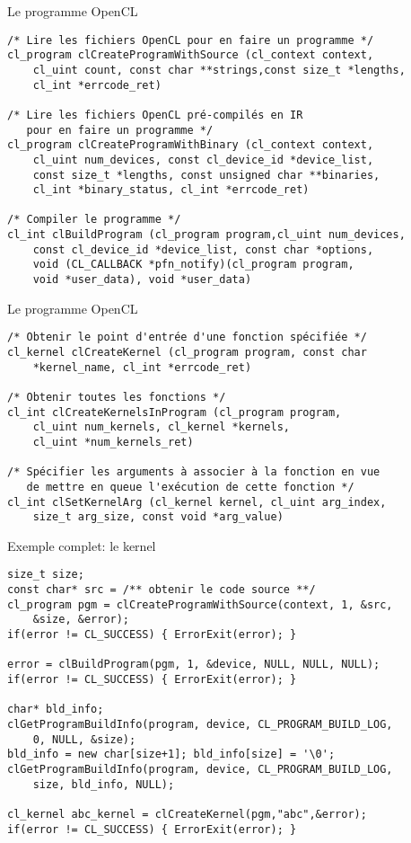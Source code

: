 \documentclass[10pt]{beamer}
\begin{document}
\begin{frame}[fragile]{Le programme OpenCL}

  \scriptsize
  \begin{verbatim}
/* Lire les fichiers OpenCL pour en faire un programme */
cl_program clCreateProgramWithSource (cl_context context,
    cl_uint count, const char **strings,const size_t *lengths,
    cl_int *errcode_ret)

/* Lire les fichiers OpenCL pré-compilés en IR 
   pour en faire un programme */
cl_program clCreateProgramWithBinary (cl_context context,
    cl_uint num_devices, const cl_device_id *device_list,
    const size_t *lengths, const unsigned char **binaries,
    cl_int *binary_status, cl_int *errcode_ret)

/* Compiler le programme */
cl_int clBuildProgram (cl_program program,cl_uint num_devices,
    const cl_device_id *device_list, const char *options,
    void (CL_CALLBACK *pfn_notify)(cl_program program,
    void *user_data), void *user_data)
  \end{verbatim}
\end{frame}

\begin{frame}[fragile]{Le programme OpenCL}

  \scriptsize
  \begin{verbatim}
/* Obtenir le point d'entrée d'une fonction spécifiée */
cl_kernel clCreateKernel (cl_program program, const char 
    *kernel_name, cl_int *errcode_ret)

/* Obtenir toutes les fonctions */
cl_int clCreateKernelsInProgram (cl_program program,
    cl_uint num_kernels, cl_kernel *kernels,
    cl_uint *num_kernels_ret)

/* Spécifier les arguments à associer à la fonction en vue
   de mettre en queue l'exécution de cette fonction */
cl_int clSetKernelArg (cl_kernel kernel, cl_uint arg_index,
    size_t arg_size, const void *arg_value)
  \end{verbatim}
\end{frame}

\begin{frame}[fragile]{Exemple complet: le kernel}

  \scriptsize
  \begin{verbatim}
size_t size;
const char* src = /** obtenir le code source **/
cl_program pgm = clCreateProgramWithSource(context, 1, &src, 
    &size, &error);
if(error != CL_SUCCESS) { ErrorExit(error); }

error = clBuildProgram(pgm, 1, &device, NULL, NULL, NULL);
if(error != CL_SUCCESS) { ErrorExit(error); }

char* bld_info;
clGetProgramBuildInfo(program, device, CL_PROGRAM_BUILD_LOG, 
    0, NULL, &size);
bld_info = new char[size+1]; bld_info[size] = '\0';
clGetProgramBuildInfo(program, device, CL_PROGRAM_BUILD_LOG, 
    size, bld_info, NULL);

cl_kernel abc_kernel = clCreateKernel(pgm,"abc",&error);
if(error != CL_SUCCESS) { ErrorExit(error); }
  \end{verbatim}
\end{frame}
\end{document}
